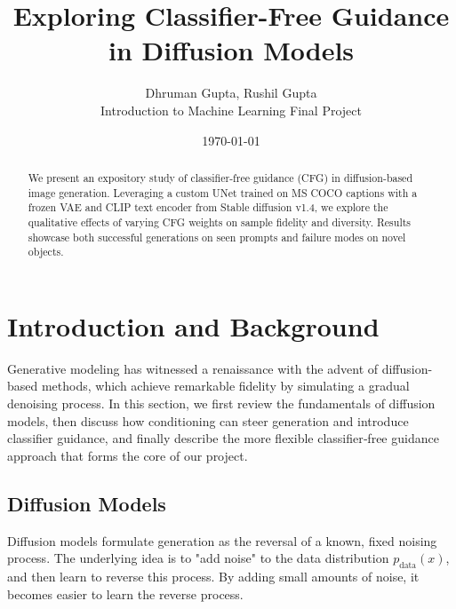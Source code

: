 \documentclass[11pt,a4paper]{article}
\title{Exploring Classifier-Free Guidance in Diffusion Models}
\author{Dhruman Gupta, Rushil Gupta \\ Introduction to Machine Learning Final Project}
\date{\today}
\begin{document}
\maketitle

\begin{abstract}
We present an expository study of classifier-free guidance (CFG) in diffusion-based image generation. Leveraging a custom UNet trained on MS COCO captions with a frozen VAE and CLIP text encoder from Stable diffusion v1.4\cite{rombach2022stablediffusion}, we explore the qualitative effects of varying CFG weights on sample fidelity and diversity. Results showcase both successful generations on seen prompts and failure modes on novel objects.
\end{abstract}

\section{Introduction and Background}

Generative modeling has witnessed a renaissance with the advent of diffusion-based methods, which achieve remarkable fidelity by simulating a gradual denoising process. In this section, we first review the fundamentals of diffusion models, then discuss how conditioning can steer generation and introduce classifier guidance, and finally describe the more flexible classifier‐free guidance approach that forms the core of our project.

\subsection{Diffusion Models}

Diffusion models \cite{ho2020denoising} formulate generation as the reversal of a known, fixed noising process. The underlying idea is to "add noise" to the data distribution $p_{\mathrm{data}}(x)$, and then learn to reverse this process. By adding small amounts of noise, it becomes easier to learn the reverse process.\\
\end{document}
